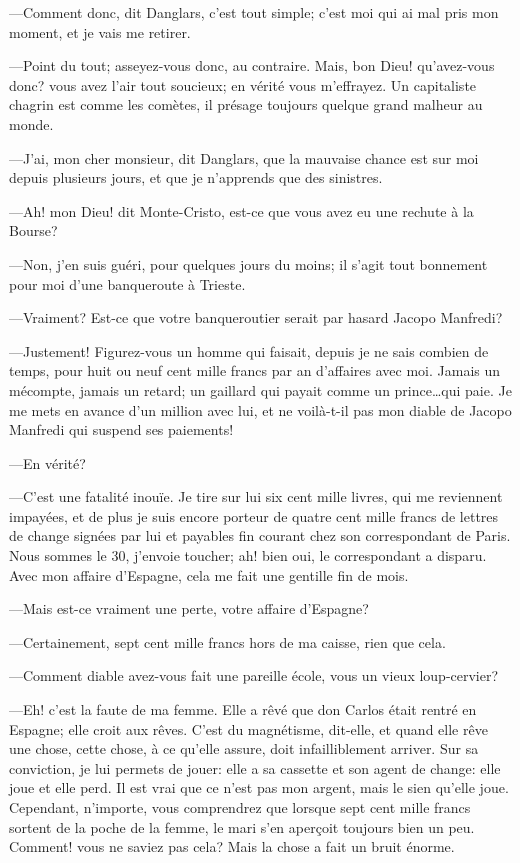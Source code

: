 —Comment donc, dit Danglars, c'est tout simple; c'est moi qui ai mal pris mon moment, et je vais me retirer. 

—Point du tout; asseyez-vous donc, au contraire. Mais, bon Dieu! qu'avez-vous donc? vous avez l'air tout soucieux; en vérité vous m'effrayez. Un capitaliste chagrin est comme les comètes, il présage toujours quelque grand malheur au monde. 

—J'ai, mon cher monsieur, dit Danglars, que la mauvaise chance est sur moi depuis plusieurs jours, et que je n'apprends que des sinistres. 

—Ah! mon Dieu! dit Monte-Cristo, est-ce que vous avez eu une rechute à la Bourse? 

—Non, j'en suis guéri, pour quelques jours du moins; il s'agit tout bonnement pour moi d'une banqueroute à Trieste. 

—Vraiment? Est-ce que votre banqueroutier serait par hasard Jacopo Manfredi? 

—Justement! Figurez-vous un homme qui faisait, depuis je ne sais combien de temps, pour huit ou neuf cent mille francs par an d'affaires avec moi. Jamais un mécompte, jamais un retard; un gaillard qui payait comme un prince\dots qui paie. Je me mets en avance d'un million avec lui, et ne voilà-t-il pas mon diable de Jacopo Manfredi qui suspend ses paiements! 

—En vérité? 

—C'est une fatalité inouïe. Je tire sur lui six cent mille livres, qui me reviennent impayées, et de plus je suis encore porteur de quatre cent mille francs de lettres de change signées par lui et payables fin courant chez son correspondant de Paris. Nous sommes le 30, j'envoie toucher; ah! bien oui, le correspondant a disparu. Avec mon affaire d'Espagne, cela me fait une gentille fin de mois. 

—Mais est-ce vraiment une perte, votre affaire d'Espagne? 

—Certainement, sept cent mille francs hors de ma caisse, rien que cela. 

—Comment diable avez-vous fait une pareille école, vous un vieux loup-cervier? 

—Eh! c'est la faute de ma femme. Elle a rêvé que don Carlos était rentré en Espagne; elle croit aux rêves. C'est du magnétisme, dit-elle, et quand elle rêve une chose, cette chose, à ce qu'elle assure, doit infailliblement arriver. Sur sa conviction, je lui permets de jouer: elle a sa cassette et son agent de change: elle joue et elle perd. Il est vrai que ce n'est pas mon argent, mais le sien qu'elle joue. Cependant, n'importe, vous comprendrez que lorsque sept cent mille francs sortent de la poche de la femme, le mari s'en aperçoit toujours bien un peu. Comment! vous ne saviez pas cela? Mais la chose a fait un bruit énorme. 

